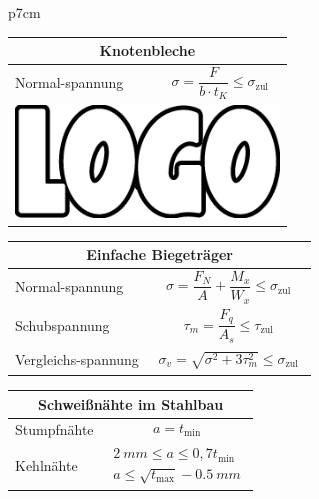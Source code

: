 \documentclass[11pt,a4paper,twocolumn]{scrartcl}
\newcommand{\ceins}{2.5cm}
\newcommand{\czwei}{5cm}
\newcommand{\cges}{7cm}
\begin{document}
\begin{tabular}{p{\cges}}
		\arrayrulecolor{gray}
	\begin{tabular}{|p{\ceins}|p{\czwei}|}
		\multicolumn{2}{c}{\textbf{\Large Knotenbleche}}\\\hline
		Normal-spannung&$$\sigma=\frac{F}{b\cdot t_K}\leq\sigma_{\text{zul}}$$\\\hline
		\multicolumn{2}{|c|}{\includegraphics[width=\cges]{logo}}\\\hline
	\end{tabular}
	\begin{tabular}{|p{\ceins}|p{\czwei}|}
		\multicolumn{2}{c}{\textbf{\Large Einfache Biegeträger}}\\\hline
		Normal-spannung&$$\sigma=\frac{F_N}{A}+\frac{M_x}{W_x} \leq \sigma_{\text{zul}}$$\\\hline
		Schubspannung&$$\tau_m=\frac{F_q}{A_s}\leq \tau_{\text{zul}}$$\\\hline
		Vergleichs-spannung&\begin{gather*}\sigma_v=\sqrt{\sigma^2+3\tau_m^2}\leq\sigma_{\text{zul}}\end{gather*}\\\hline
	\end{tabular}
\begin{tabular}{|p{\ceins}|p{\czwei}|}
	\multicolumn{2}{c}{\textbf{\Large Schweißnähte im Stahlbau}}\\\hline
	Stumpfnähte&$$ a=t_{\text{min}}$$\\\hline
	Kehlnähte&\begin{gather*}\SI{2}{mm}\leq a \leq 0,7t_{\text{min}}\\ a\leq\sqrt{t_{\text{max}}}-\SI{0.5}{mm}\end{gather*}\\\hline	
\end{tabular}
\end{tabular}
\end{document}
